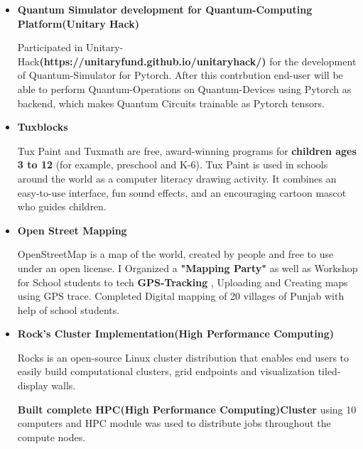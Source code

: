 \documentclass[11pt,a4paper,sans]{moderncv}        %
\begin{document}
{\begin{itemize}
\vspace{6pt}

\item \textbf{Quantum Simulator development for Quantum-Computing Platform(Unitary Hack) }
\vspace{3pt}

Participated in Unitary-Hack\textbf{(https://unitaryfund.github.io/unitaryhack/)} for the development of
Quantum-Simulator for Pytorch. After this contrbution end-user will be able to perform Quantum-Operations
on Quantum-Devices using Pytorch as backend, which makes Quantum Circuits trainable as Pytorch tensors.

\vspace{6pt}

\item \textbf{Tuxblocks}
\vspace{3pt}

Tux Paint and Tuxmath are free,
award-winning programs for \textbf{children ages 3 to 12} (for example, preschool and K-6).
Tux Paint is used in schools around the world as a computer literacy drawing activity.
It combines an easy-to-use interface, fun sound effects,
and an encouraging cartoon mascot who guides children.

\vspace{6pt}

\item \textbf{Open Street Mapping}

\vspace{3pt}

OpenStreetMap is a map of the world, created by people and free to use under an open license.
I Organized a \textbf{"Mapping Party"} as well as Workshop for School students to tech \textbf{GPS-Tracking} ,
Uploading and Creating maps using GPS trace.
Completed Digital mapping of 20 villages of Punjab with help of school students.

\vspace{6pt}

\item \textbf{Rock's Cluster Implementation(High Performance Computing)}

\vspace{3pt}

Rocks is an open-source Linux cluster distribution that enables end users to easily
build computational clusters,
 grid endpoints and visualization tiled-display walls.

\textbf{Built complete HPC(High Performance Computing)Cluster} using 10 computers and HPC
module was used to distribute jobs throughout the compute nodes.


\end{itemize}}
\end{document}
